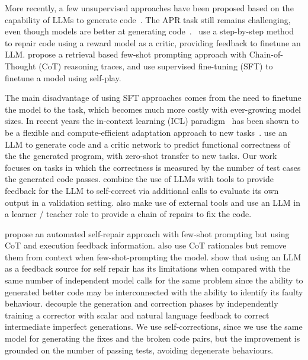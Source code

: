 \documentclass[11pt, a4paper, logo, copyright]{googledeepmind}
\begin{document}
More recently, a few unsupervised approaches have been proposed based on the capability of LLMs to generate code~\citep{chen2021evaluating,nijkamp2023codegen, chowdhery2024palmcoder, li2022alphacode, fried2023incoder, li2023starcoder}. The APR task still remains challenging, even though models are better at generating code~\citep{olausson2024self,chen2023teaching}. \citet{zhao2024repair}~use a step-by-step method to repair code using a reward model as a critic, providing feedback to finetune an LLM. \citet{shypula2024codeedits} propose a retrieval based few-shot prompting approach with Chain-of-Thought (CoT) reasoning traces, and use supervised fine-tuning (SFT) to finetune a model using self-play.

The main disadvantage of using SFT approaches comes from the need to finetune the model to the task, which becomes much more costly with ever-growing model sizes. In recent years the in-context learning (ICL) paradigm~\citep{brown2020icl} has been shown to be a flexible and compute-efficient adaptation approach to new tasks~\citep{oswald2022iclgrad, akyurek2023ICLlinear}. \citet{le2022coderl} use an LLM to generate code and a critic network to predict functional correctness of the the generated program, with zero-shot transfer to new tasks. Our work focuses on tasks in which the correctness is measured by the number of test cases the generated code passes. \citet{Gou2024critic} combine the use of LLMs with tools to provide feedback for the LLM to self-correct via additional calls to evaluate its own output in a validation setting. \citet{wang2024intervenor} also make use of external tools and use an LLM in a learner / teacher role to provide a chain of repairs to fix the code.

\citet{xin2024thinkrepair} propose an automated self-repair approach with few-shot prompting but using CoT and execution feedback information. \citet{agarwal2024manyshot} also use CoT rationales but remove them from context when few-shot-prompting the model. \citet{olausson2024self} show that using an LLM as a feedback source for self repair has its limitations when compared with the same number of independent model calls for the same problem since the ability to generated better code may be interconnected with the ability to identify its faulty behaviour. \citet{welleck2023selfcorrect} decouple the generation and correction phases by independently training a corrector with scalar and natural language feedback to correct intermediate imperfect generations. We use self-corrections, since we use the same model for generating the fixes and the broken code pairs, but the improvement is grounded on the number of passing tests, avoiding degenerate behaviours.
\end{document}
